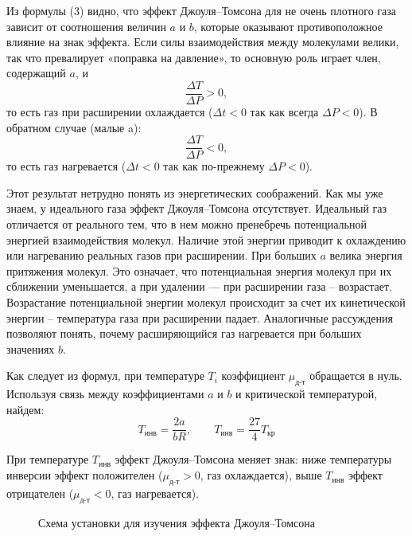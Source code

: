 \documentclass[a4paper,12pt]{article}
\begin{document}
	Из формулы (3) видно, что эффект Джоуля–Томсона для не очень плотного газа зависит от соотношения величин $a$ и $b$, которые оказывают противоположное влияние на знак эффекта. Если силы взаимодействия между молекулами велики, так что превалирует «поправка на давление», то основную роль играет член, содержащий $a$, и
	\[ \frac{\Delta T}{\Delta P} > 0, \]
	то есть газ при расширении охлаждается ($\Delta t < 0$ так как всегда
	$\Delta P < 0$). В обратном случае (малые a):
	\[ \frac{\Delta T}{\Delta P} < 0, \]
	то есть газ нагревается ($\Delta t < 0$ так как по-прежнему $\Delta P < 0$).
	
	Этот результат нетрудно понять из энергетических соображений. Как мы уже знаем, у идеального газа эффект Джоуля–Томсона отсутствует. Идеальный газ отличается от реального тем, что в нем можно пренебречь потенциальной энергией взаимодействия молекул. Наличие этой энергии приводит к охлаждению или нагреванию реальных газов при расширении. При больших $a$ велика энергия притяжения молекул. Это означает, что потенциальная энергия молекул при их сближении уменьшается, а при удалении — при расширении газа -- возрастает. Возрастание потенциальной энергии молекул происходит за счет их кинетической энергии -- температура газа при расширении падает. Аналогичные рассуждения позволяют понять, почему расширяющийся газ нагревается при больших значениях $b$.
	
	Как следует из формул, при температуре $T_i$ коэффициент $\mu_\text{д-т}$ обращается в нуль. Используя связь между коэффициентами $a$ и $b$ и критической температурой, найдем:
	\begin{equation}
		T_{инв}=\frac{2a}{bR}, \qquad
		T_{инв}=\frac{27}{4}T_{кр}
	\end{equation}
	
	При температуре $T_\text{инв}$ эффект Джоуля–Томсона меняет знак: ниже температуры инверсии эффект положителен ($\mu_\text{д-т} > 0$, газ охлаждается), выше $T_\text{инв}$ эффект отрицателен ($\mu_\text{д-т} < 0$, газ нагревается).	
	
	
	\begin{figure}[h!]
		\caption[]{\label{fig:1} Схема установки для изучения эффекта Джоуля–Томсона}
	\end{figure}
	
\end{document}
